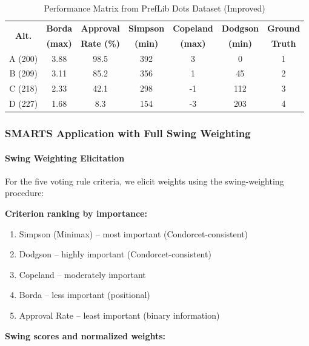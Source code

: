 \documentclass[conference]{IEEEtran}
\begin{document}
\begin{table}[H]
	\centering
	\caption{Performance Matrix from PrefLib Dots Dataset (Improved)}
	\label{tab:preflib_data_improved}
	\smalltable
	\begin{tabular}{|c|c|c|c|c|c|c|}
		\hline
		\multirow{2}{*}{\textbf{Alt.}} & \textbf{Borda} & \textbf{Approval} & \textbf{Simpson} & \textbf{Copeland} & \textbf{Dodgson} & \textbf{Ground} \\
		& \textbf{(max)} & \textbf{Rate (\%)} & \textbf{(min)} & \textbf{(max)} & \textbf{(min)} & \textbf{Truth} \\
		\hline
		A (200) & 3.88 & 98.5 & 392 & 3 & 0 & 1 \\
		B (209) & 3.11 & 85.2 & 356 & 1 & 45 & 2 \\
		C (218) & 2.33 & 42.1 & 298 & -1 & 112 & 3 \\
		D (227) & 1.68 & 8.3 & 154 & -3 & 203 & 4 \\
		\hline
	\end{tabular}
\end{table}

\subsubsection{SMARTS Application with Full Swing Weighting}

\paragraph{Swing Weighting Elicitation}

For the five voting rule criteria, we elicit weights using the swing-weighting procedure:

\textbf{Criterion ranking by importance:}
\begin{enumerate}
	\item Simpson (Minimax) -- most important (Condorcet-consistent)
	\item Dodgson -- highly important (Condorcet-consistent)
	\item Copeland -- moderately important
	\item Borda -- less important (positional)
	\item Approval Rate -- least important (binary information)
\end{enumerate}

\textbf{Swing scores and normalized weights:}
\end{document}
